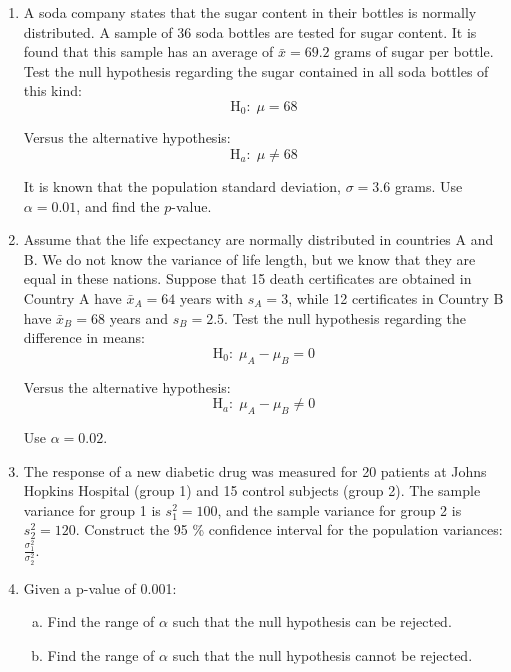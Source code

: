 \begin{enumerate}[Q 1.]
\vspace{35mm}
\item A soda company states that the sugar content in their bottles is normally distributed. A sample of 36 soda bottles are tested for sugar content. It is found that this sample has an average of $\bar{x} = 69.2$ grams of sugar per bottle. Test the null hypothesis regarding the sugar contained in all soda bottles of this kind:
$$\text{H}_0: \; \mu = 68$$

Versus the alternative hypothesis:
$$\text{H}_a: \; \mu \neq 68$$

It is known that the population standard deviation, $\sigma = 3.6$ grams. Use $\alpha = 0.01$, and find the $p$-value.
	
\vspace{35mm}
\item Assume that the life expectancy are normally distributed in countries A and B. We do not know the variance of life length, but we know that they are equal in these nations. Suppose that 15 death certificates are obtained in Country A have $\bar{x}_A = 64$ years with $s_A = 3$, while 12 certificates in Country B have $\bar{x}_B = 68$ years and $s_B = 2.5$. Test the null hypothesis regarding the difference in means:
$$\text{H}_0: \; \mu_A - \mu_B = 0$$

Versus the alternative hypothesis:
$$\text{H}_a: \; \mu_A - \mu_B \neq 0$$

Use $\alpha = 0.02$.
	
\vspace{35mm}
\item
The response of a new diabetic drug was measured for 20 patients at Johns Hopkins Hospital (group 1) and 15 control subjects (group 2). The sample variance for group 1 is $s_1^2 = 100$, and the sample variance for group 2 is $s_2^2 = 120$. Construct the 95 \% confidence interval for the population variances: $\frac{\sigma_1^2}{\sigma_2^2}$. 

\vspace{35mm}
\item Given a p-value of 0.001: 
	\begin{enumerate}[(a)]
	\item Find the range of $\alpha$ such that the null hypothesis can be rejected. 
	\item Find the range of $\alpha$ such that the null hypothesis cannot be rejected.
	\end{enumerate}
	

\end{enumerate}
